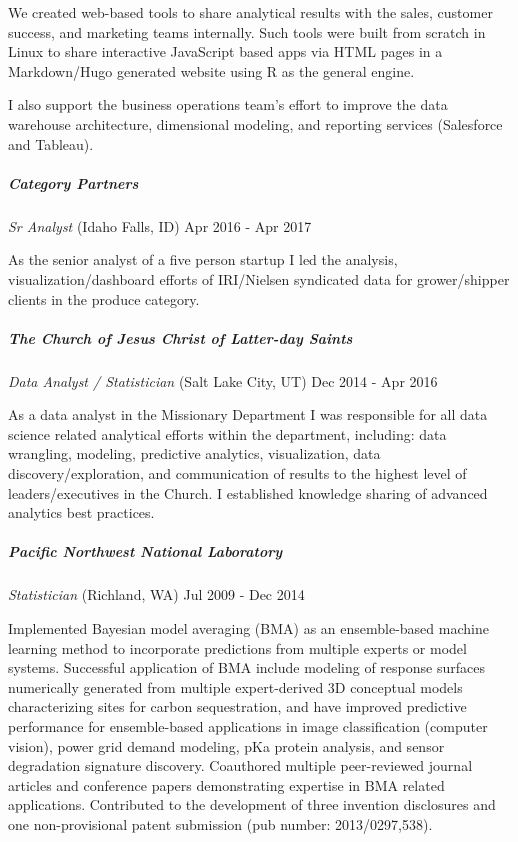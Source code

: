 \documentclass[11pt,]{article}
\let\oldsubparagraph\subparagraph
\renewcommand{\subparagraph}[1]{\oldsubparagraph{#1}\mbox{}}
\begin{document}
We created web-based tools to share analytical results with the sales,
customer success, and marketing teams internally. Such tools were built
from scratch in Linux to share interactive JavaScript based apps via
HTML pages in a Markdown/Hugo generated website using R as the general
engine.

I also support the business operations team's effort to improve the data
warehouse architecture, dimensional modeling, and reporting services
(Salesforce and Tableau).

\subparagraph{Category Partners}\label{category-partners}

\emph{Sr Analyst} (Idaho Falls, ID) \hfill Apr 2016 - Apr 2017

As the senior analyst of a five person startup I led the analysis,
visualization/dashboard efforts of IRI/Nielsen syndicated data for
grower/shipper clients in the produce category.

\subparagraph{The Church of Jesus Christ of Latter-day
Saints}\label{the-church-of-jesus-christ-of-latter-day-saints}

\emph{Data Analyst / Statistician} (Salt Lake City, UT) \hfill Dec 2014
- Apr 2016

As a data analyst in the Missionary Department I was responsible for all
data science related analytical efforts within the department,
including: data wrangling, modeling, predictive analytics,
visualization, data discovery/exploration, and communication of results
to the highest level of leaders/executives in the Church. I established
knowledge sharing of advanced analytics best practices.

\subparagraph{Pacific Northwest National
Laboratory}\label{pacific-northwest-national-laboratory}

\emph{Statistician} (Richland, WA) \hfill Jul 2009 - Dec 2014

Implemented Bayesian model averaging (BMA) as an ensemble-based machine
learning method to incorporate predictions from multiple experts or
model systems. Successful application of BMA include modeling of
response surfaces numerically generated from multiple expert-derived 3D
conceptual models characterizing sites for carbon sequestration, and
have improved predictive performance for ensemble-based applications in
image classification (computer vision), power grid demand modeling, pKa
protein analysis, and sensor degradation signature discovery. Coauthored
multiple peer-reviewed journal articles and conference papers
demonstrating expertise in BMA related applications. Contributed to the
development of three invention disclosures and one non-provisional
patent submission (pub number: 2013/0297,538).
\end{document}
